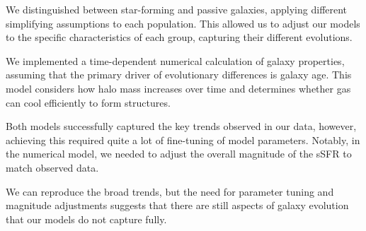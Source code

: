 \documentclass[fleqn,usenatbib]{mnras}
\begin{document}
We distinguished between star-forming and passive galaxies, applying different simplifying assumptions to each population. This allowed us to adjust our models to the specific characteristics of each group, capturing their different evolutions.

We implemented a time-dependent numerical calculation of galaxy properties, assuming that the primary driver of evolutionary differences is galaxy age. This model considers how halo mass increases over time and determines whether gas can cool efficiently to form structures.

Both models successfully captured the key trends observed in our data, however, achieving this required quite a lot of fine-tuning of model parameters. Notably, in the numerical model, we needed to adjust the overall magnitude of the sSFR to match observed data.

We can reproduce the broad trends, but the need for parameter tuning and magnitude adjustments suggests that there are still aspects of galaxy evolution that our models do not capture fully.







\bsp	%
\label{lastpage}
\end{document}
